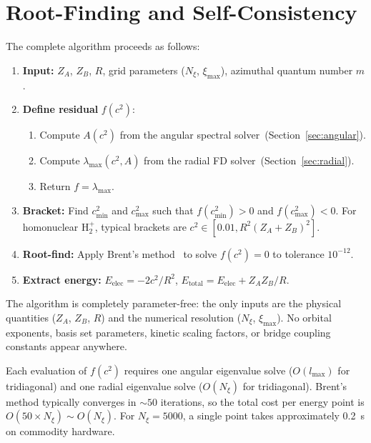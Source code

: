 \documentclass[aps,pra,twocolumn,superscriptaddress,longbibliography]{revtex4-2}
\begin{document}

\section{Root-Finding and Self-Consistency}
\label{sec:rootfinding}

The complete algorithm proceeds as follows:

\begin{enumerate}
  \item \textbf{Input:} $Z_A$, $Z_B$, $R$, grid parameters
        ($N_\xi$, $\xi_{\max}$), azimuthal quantum number $m$.
  \item \textbf{Define residual} $f(c^2)$:
    \begin{enumerate}
      \item Compute $A(c^2)$ from the angular spectral
            solver~(Section~\ref{sec:angular}).
      \item Compute $\lambda_{\max}(c^2, A)$ from the radial FD
            solver~(Section~\ref{sec:radial}).
      \item Return $f = \lambda_{\max}$.
    \end{enumerate}
  \item \textbf{Bracket:} Find $c^2_{\min}$ and $c^2_{\max}$ such
        that $f(c^2_{\min}) > 0$ and $f(c^2_{\max}) < 0$.  For
        homonuclear H$_2^+$, typical brackets are $c^2 \in
        [0.01, R^2(Z_A + Z_B)^2]$.
  \item \textbf{Root-find:} Apply Brent's method~\cite{Brent1973}
        to solve $f(c^2) = 0$ to tolerance $10^{-12}$.
  \item \textbf{Extract energy:}
        $E_{\mathrm{elec}} = -2c^2/R^2$, \quad
        $E_{\mathrm{total}} = E_{\mathrm{elec}} + Z_A Z_B / R$.
\end{enumerate}

The algorithm is completely parameter-free: the only inputs are the
physical quantities ($Z_A$, $Z_B$, $R$) and the numerical resolution
($N_\xi$, $\xi_{\max}$).  No orbital exponents, basis set parameters,
kinetic scaling factors, or bridge coupling constants appear anywhere.

Each evaluation of $f(c^2)$ requires one angular eigenvalue solve
($O(l_{\max})$ for tridiagonal) and one radial eigenvalue solve
($O(N_\xi)$ for tridiagonal).  Brent's method typically converges in
$\sim 50$ iterations, so the total cost per energy point is
$O(50 \times N_\xi) \sim O(N_\xi)$.  For $N_\xi = 5000$, a single
point takes approximately 0.2~s on commodity hardware.
\end{document}
